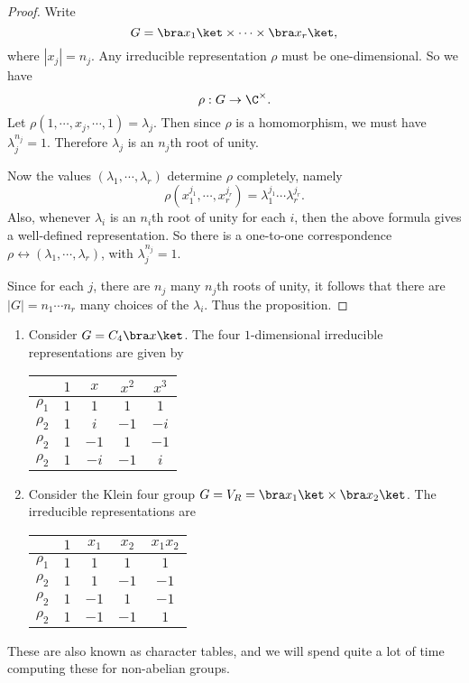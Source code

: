 \documentclass[a4paper]{article}
\begin{document}
\begin{proof}
  Write
  \[
    G = \bra x_1\ket \times \cdots \times \bra x_r\ket,
  \]
  where $|x_j| = n_j$. Any irreducible representation $\rho$ must be one-dimensional. So we have
  \[
    \rho: G \to \C^\times.
  \]
  Let $\rho(1, \cdots, x_j, \cdots, 1) = \lambda_j$. Then since $\rho$ is a homomorphism, we must have $\lambda_j^{n_j} = 1$. Therefore $\lambda_j$ is an $n_j$th root of unity.

  Now the values $(\lambda_1, \cdots, \lambda_r)$ determine $\rho$ completely, namely
  \[
    \rho(x_1^{j_1}, \cdots, x_r^{j_r}) = \lambda_1^{j_1} \cdots \lambda_r ^{j_r}.
  \]
  Also, whenever $\lambda_i$ is an $n_i$th root of unity for each $i$, then the above formula gives a well-defined representation. So there is a one-to-one correspondence $\rho \leftrightarrow (\lambda_1, \cdots, \lambda_r)$, with $\lambda_j^{n_j} = 1$.

  Since for each $j$, there are $n_j$ many $n_j$th roots of unity, it follows that there are $|G| = n_1\cdots n_r$ many choices of the $\lambda_i$. Thus the proposition.
\end{proof}

\begin{eg}\leavevmode
  \begin{enumerate}
    \item Consider $G = C_4 \bra x\ket$. The four $1$-dimensional irreducible representations are given by
      \begin{center}
        \begin{tabular}{ccccc}
          \toprule
          & $1$ & $x$ & $x^2$ & $x^3$\\
          \midrule
          $\rho_1$ & $1$ & $1$ & $1$ & $1$\\
          $\rho_2$ & $1$ & $i$ & $-1$ & $-i$\\
          $\rho_2$ & $1$ & $-1$ & $1$ & $-1$\\
          $\rho_2$ & $1$ & $-i$ & $-1$ & $i$\\
          \bottomrule
        \end{tabular}
      \end{center}
    \item Consider the Klein four group $G = V_R = \bra x_1 \ket \times \bra x_2\ket$. The irreducible representations are
      \begin{center}
        \begin{tabular}{ccccc}
          \toprule
          & $1$ & $x_1$ & $x_2$ & $x_1x_2$\\
          \midrule
          $\rho_1$ & $1$ & $1$ & $1$ & $1$\\
          $\rho_2$ & $1$ & $1$ & $-1$ & $-1$\\
          $\rho_2$ & $1$ & $-1$ & $1$ & $-1$\\
          $\rho_2$ & $1$ & $-1$ & $-1$ & $1$\\
          \bottomrule
        \end{tabular}
      \end{center}
  \end{enumerate}
\end{eg}
These are also known as character tables, and we will spend quite a lot of time computing these for non-abelian groups.
\end{document}

